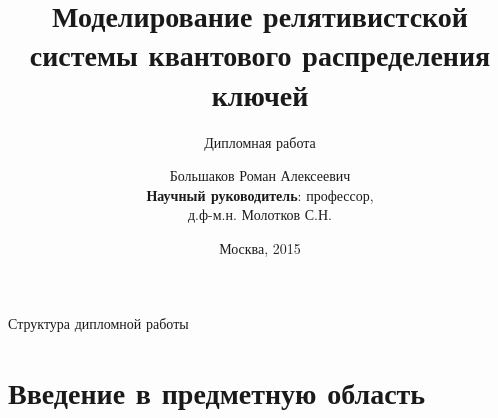 \documentclass[aspectratio=43, notes=hide]{beamer}
\begin{document}
\title{Моделирование релятивистской системы квантового распределения ключей}
\subtitle{Дипломная работа}
\author{Большаков Роман Алексеевич\\ 
\textbf{Научный руководитель}: профессор,\\ д.ф-м.н. Молотков С.Н. }
\date{Москва, 2015}
\maketitle

\begin{frame}{Структура дипломной работы}
  \tableofcontents
\end{frame}

\section{Введение в предметную область}
\end{document}
